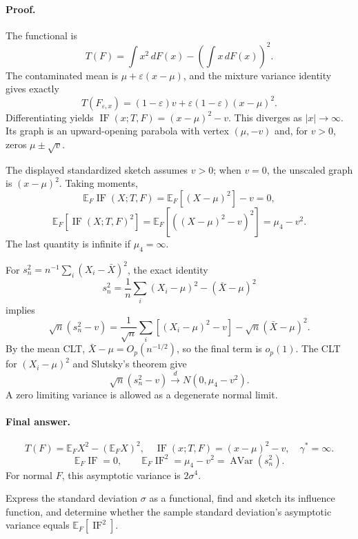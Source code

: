 \documentclass[answers,12pt,addpoints]{exam}
\providecommand{\E}{\mathbb{E}}
\providecommand{\IF}{\operatorname{IF}}
\providecommand{\GES}{\gamma^*}
\begin{document}
\begin{questions}
\begin{solution}
\paragraph{Proof.}
The functional is
\[
T(F)=\int x^2\,dF(x)-\left(\int x\,dF(x)\right)^2.
\]
The contaminated mean is $\mu+\varepsilon(x-\mu)$, and the mixture
variance identity gives exactly
\[
T(F_{\varepsilon,x})=(1-\varepsilon)v
+\varepsilon(1-\varepsilon)(x-\mu)^2.
\]
Differentiating yields
$\IF(x;T,F)=(x-\mu)^2-v$. This diverges as $|x|\to\infty$.
Its graph is an upward-opening parabola with vertex $(\mu,-v)$ and,
for $v>0$, zeros $\mu\pm\sqrt v$.
\begin{center}
\end{center}
The displayed standardized sketch assumes $v>0$; when $v=0$, the
unscaled graph is $(x-\mu)^2$.
Taking moments,
\[
\E_F\IF(X;T,F)=\E_F[(X-\mu)^2]-v=0,
\]
\[
\E_F[\IF(X;T,F)^2]
=\E_F[((X-\mu)^2-v)^2]=\mu_4-v^2.
\]
The last quantity is infinite if $\mu_4=\infty$.

For $s_n^2=n^{-1}\sum_i(X_i-\bar X)^2$, the exact identity
\[
s_n^2=\frac1n\sum_i(X_i-\mu)^2-(\bar X-\mu)^2
\]
implies
\[
\sqrt n(s_n^2-v)
=\frac1{\sqrt n}\sum_i[(X_i-\mu)^2-v]
-\sqrt n(\bar X-\mu)^2.
\]
By the mean CLT, $\bar X-\mu=O_p(n^{-1/2})$, so the final term is
$o_p(1)$. The CLT for $(X_i-\mu)^2$ and Slutsky's theorem give
\[
\sqrt n(s_n^2-v)\xrightarrow{d}N(0,\mu_4-v^2).
\]
A zero limiting variance is allowed as a degenerate normal limit.

\paragraph{Final answer.}
\[
\boxed{T(F)=\E_FX^2-(\E_FX)^2,\quad
\IF(x;T,F)=(x-\mu)^2-v,\quad \GES=\infty.}
\]
\[
\boxed{\E_F\IF=0,\qquad \E_F\IF^2=\mu_4-v^2
=\operatorname{AVar}(s_n^2).}
\]
For normal $F$, this asymptotic variance is $2\sigma^4$.
\end{solution}

\question
Express the standard deviation $\sigma$ as a functional, find and
sketch its influence function, and determine whether the sample
standard deviation's asymptotic variance equals $\E_F[\IF^2]$.


\end{questions}
\end{document}
